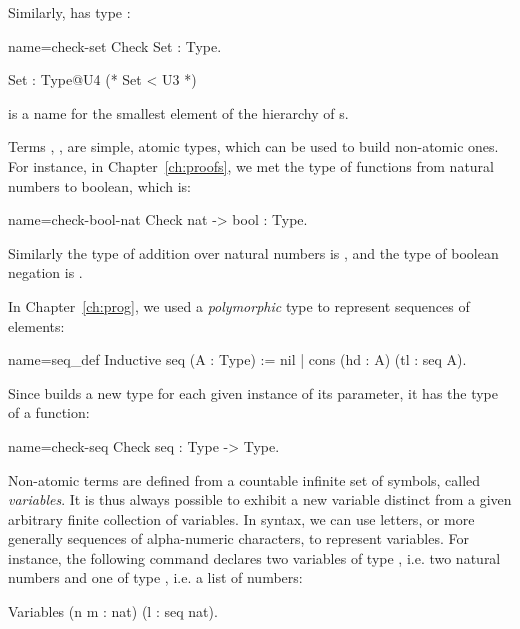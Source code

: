 Similarly,  has type :

\begin{coq-left}{name=check-set}{}
Check Set : Type.
\end{coq-left}
\begin{coqout-right}
Set : Type@{U4} (* Set < U3 *)
\end{coqout-right}

\noindent
{} is a name for the smallest element of the hierarchy of s.

Terms , ,  are simple, atomic types, which can be used
to build non-atomic ones. For instance, in Chapter~\ref{ch:proofs}, we
met the type of functions from natural numbers to boolean, which is:

\begin{coq}{name=check-bool-nat}{}
Check nat -> bool : Type.
\end{coq}

Similarly the type of addition over natural numbers is 
, and the type of boolean negation is 
.

In Chapter~\ref{ch:prog}, we used a \emph{polymorphic} type to represent
sequences of elements:

\begin{coq}{name=seq_def}{}
Inductive seq (A : Type) := nil | cons (hd : A) (tl : seq A).
\end{coq}

Since  builds a new type for each given instance of its
parameter, it has the type of a function:

\begin{coq}{name=check-seq}{}
Check seq : Type -> Type.
\end{coq}

Non-atomic terms are defined from a countable infinite set of
symbols, called  \emph{variables}.
It is thus always possible to exhibit a new variable
distinct from a given arbitrary finite collection of variables. In \Coq{}
syntax, we can use letters, or more generally sequences of
alpha-numeric characters, to represent variables. For instance, the
following command declares two variables of type , i.e. two
natural numbers and one of type , i.e. a list of numbers:

\begin{coq}{}{}
Variables (n m : nat) (l : seq nat).
\end{coq}

